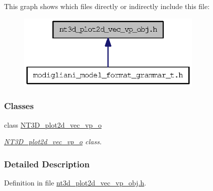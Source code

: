 This graph shows which files directly or indirectly include this file:
\nopagebreak
\begin{figure}[H]
\begin{center}
\leavevmode
\includegraphics[width=250pt]{nt3d__plot2d__vec__vp__obj_8h__dep__incl}
\end{center}
\end{figure}
\subsubsection*{Classes}
\begin{DoxyCompactItemize}
\item 
class \hyperlink{class_n_t3_d__plot2d__vec__vp__o}{NT3D\_\-plot2d\_\-vec\_\-vp\_\-o}
\begin{DoxyCompactList}\small\item\em \hyperlink{class_n_t3_d__plot2d__vec__vp__o}{NT3D\_\-plot2d\_\-vec\_\-vp\_\-o} class. \item\end{DoxyCompactList}\end{DoxyCompactItemize}


\subsubsection{Detailed Description}


Definition in file \hyperlink{nt3d__plot2d__vec__vp__obj_8h_source}{nt3d\_\-plot2d\_\-vec\_\-vp\_\-obj.h}.


